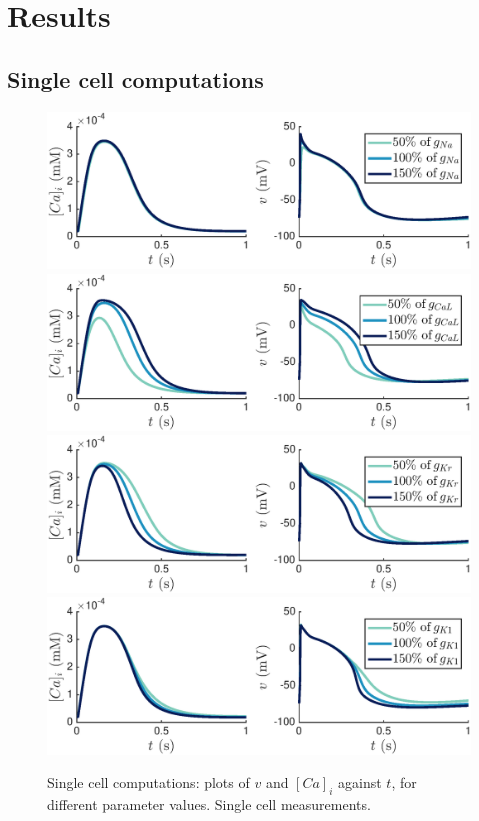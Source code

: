 \documentclass{article}
\begin{document}
\section{Results} \label{Results}
\subsection{Single cell computations} \label{Single cell computations}
%
\begin{figure}
   \includegraphics[trim=0cm 0cm 0cm 0cm, clip=true, width=1\linewidth]{sc_gna} 
   \includegraphics[trim=0cm 0cm 0cm 0cm, clip=true, width=1\linewidth]{sc_gcal} 
      \includegraphics[trim=0cm 0cm 0cm 0cm, clip=true, width=1\linewidth]{sc_gkr} 
         \includegraphics[trim=0cm 0cm 0cm 0cm, clip=true, width=1\linewidth]{sc_gk1} 
    \caption{Single cell computations: plots of $v$ and $[Ca]_i$ against $t$, for different parameter values. Single cell measurements.}
    \label{fig:4a}
\end{figure}
\end{document}
